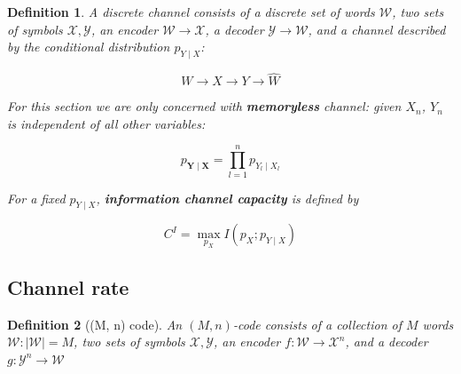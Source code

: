 \documentclass{article}
\newcommand{\norm}[1]{\vert {#1} \vert}
\newtheorem{definition}{Definition}[section]
\begin{document}
    \begin{definition}
        A discrete channel consists of a discrete set of words $\mathcal{W}$, two sets of symbols $\mathcal{X}, \mathcal{Y}$, an encoder $\mathcal{W} \rightarrow \mathcal{X}$, a decoder $\mathcal{Y} \rightarrow \mathcal{W}$, and a channel described by the conditional distribution $p_{Y \mid X}$:

        \begin{equation*}
            W \rightarrow X \rightarrow Y \rightarrow \hat{W}
        \end{equation*}

        For this section we are only concerned with \textbf{memoryless} channel: given $X_n$, $Y_n$ is independent of all other variables:

        \begin{equation*}
            p_{\mathbf{Y} \mid \mathbf{X}} = \prod_{l=1}^n p_{Y_l \mid X_l}
        \end{equation*}

        For a fixed $p_{Y \mid X}$, \textbf{information channel capacity} is defined by

        \begin{equation*}
            C^I = \max_{p_X} I(p_X; p_{Y \mid X})
        \end{equation*}
    \end{definition}

    \subsection{Channel rate}
    \begin{definition}[(M, n) code]
        An $(M, n)$-code consists of a collection of $M$ words $\mathcal{W}: \norm{\mathcal{W}} = M$, two sets of symbols $\mathcal{X}, \mathcal{Y}$, an encoder $f: \mathcal{W} \rightarrow \mathcal{X}^n$, and a decoder $g: \mathcal{Y}^n \rightarrow \mathcal{W}$
    \end{definition}
\end{document}
